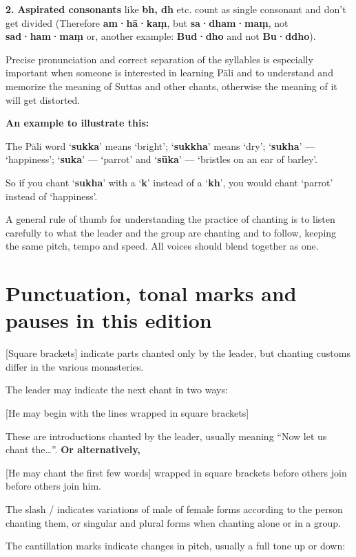 \textbf{2.} \textbf{Aspirated consonants} like \textbf{bh, dh} etc.
count as single consonant and don't get divided (Therefore
\textbf{am·hā·kaṃ}, but \textbf{sa·dham·maṃ}, not \textbf{sad·ham·maṃ}
or, another example: \textbf{Bud·dho} and not \textbf{Bu·ddho}).

Precise pronunciation and correct separation of the syllables is
especially important when someone is interested in learning Pāli and to
understand and memorize the meaning of Suttas and other chants,
otherwise the meaning of it will get distorted.

\textbf{An example to illustrate this:}

The Pāli word ‘\textbf{sukka}’ means ‘bright’; ‘\textbf{sukkha}’ means
‘dry’; ‘\textbf{sukha}’ --- ‘happiness’; ‘\textbf{suka}’ --- ‘parrot’ and
‘\textbf{sūka}’ --- ‘bristles on an ear of barley’.

So if you chant ‘\textbf{sukha}’ with a ‘\textbf{k}’ instead of a
‘\textbf{kh}’, you would chant ‘parrot’ instead of ‘happiness’.

A general rule of thumb for understanding the practice of chanting is to
listen carefully to what the leader and the group are chanting and to
follow, keeping the same pitch, tempo and speed. All voices should blend
together as one.

\section{Punctuation, tonal marks and pauses in this edition}

[Square brackets] indicate parts chanted only by the leader, but
chanting customs differ in the various monasteries.

The leader may indicate the next chant in two ways:

[He may begin with the lines wrapped in square brackets]

These are introductions chanted by the leader, usually meaning ``Now let
us chant the\ldots''. \textbf{Or alternatively,}

[He may chant the first few words] wrapped in square brackets before
others join before others join him.

The slash / indicates variations of male of female forms according to
the person chanting them, or singular and plural forms when chanting
alone or in a group.

The cantillation marks indicate changes in pitch, usually a full tone up or down:

